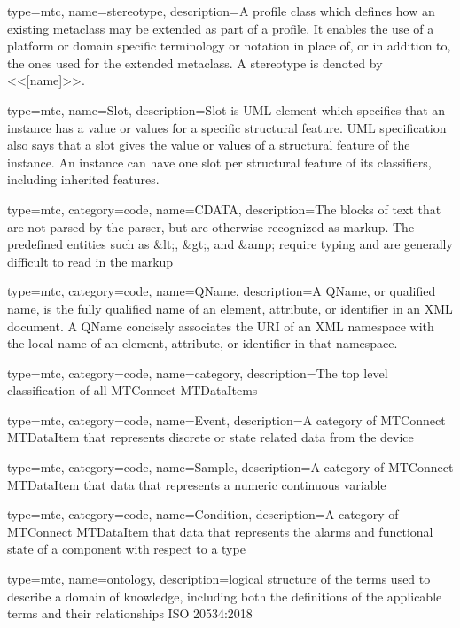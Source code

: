 {
  type=mtc,
  name=stereotype,
  description={A profile class which defines how an existing metaclass may be extended as part of a profile. It enables the use of a platform or domain specific terminology or notation in place of, or in addition to, the ones used for the extended metaclass. A stereotype is denoted by <<[name]>>.}
}

{
  type=mtc,
  name=Slot,
  description={Slot is UML element which specifies that an instance has a value or values for a specific structural feature. UML specification also says that a slot gives the value or values of a structural feature of the instance. An instance can have one slot per structural feature of its classifiers, including inherited features.}
}

{
  type=mtc,
  category=code,
  name=CDATA,
  description={The blocks of text that are not parsed by the parser, but are otherwise recognized as markup. The predefined entities such as \&lt;, \&gt;, and \&amp; require typing and are generally difficult to read in the markup}
}

{
  type=mtc,
  category=code,
  name=QName,
  description={A QName, or qualified name, is the fully qualified name of an element, attribute, or identifier in an XML document. A QName concisely associates the URI of an XML namespace with the local name of an element, attribute, or identifier in that namespace.}
}

{
  type=mtc,
  category=code,
  name=category,
  description={The top level classification of all MTConnect \glspl{MTDataItem}}
}


{
  type=mtc,
  category=code,
  name=Event,
  description={A category of MTConnect \gls{MTDataItem} that represents discrete or state related data from the device}
}

{
  type=mtc,
  category=code,
  name=Sample,
  description={A category of MTConnect \gls{MTDataItem} that data that represents a numeric continuous variable}
}

{
  type=mtc,
  category=code,
  name=Condition,
  description={A category of MTConnect \gls{MTDataItem} that data that represents the alarms and functional state of a component with respect to a \gls{type}}
}

{
  type=mtc,
  name=ontology,
  description={logical structure of the terms used to describe a domain of knowledge, including both the definitions of the applicable terms and their relationships ISO 20534:2018}
}

